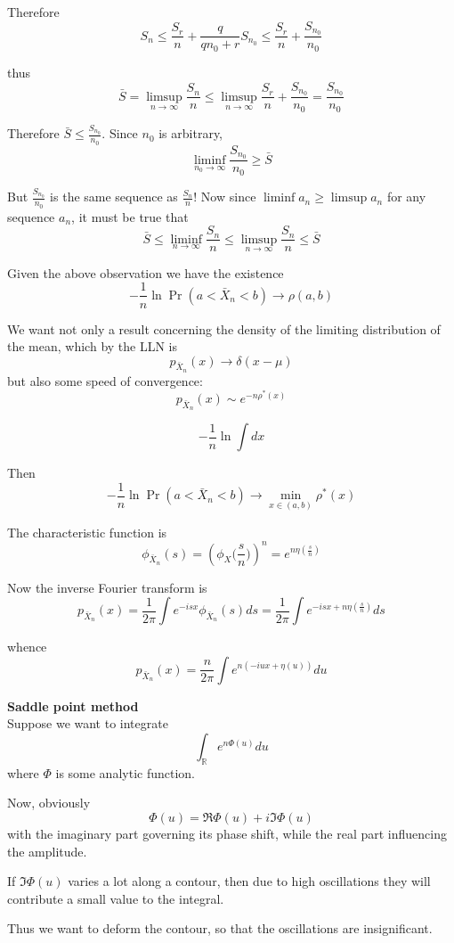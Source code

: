 \documentclass[a4paper]{article}
\newcommand{\brac}[1]{{\left ( #1 \right )}}
\newcommand{\Real}{\mathbb{R}}
\begin{document}
Therefore 
\[S_n \leq \frac{S_r}{n} + \frac{q}{q n_0 + r}S_{n_0}\leq \frac{S_r}{n} + \frac{S_{n_0}}{n_0}\]

thus
\[\bar{S} = \limsup_{n\to \infty} \frac{S_n}{n} \leq \limsup_{n\to \infty} \frac{S_r}{n} + \frac{S_{n_0}}{n_0} = \frac{S_{n_0}}{n_0}\]

Therefore $\bar{S}\leq \frac{S_{n_0}}{n_0}$. Since $n_0$ is arbitrary, 
\[\liminf_{n_0\to\infty} \frac{S_{n_0}}{n_0} \geq \bar{S}\]

But $\frac{S_{n_0}}{n_0}$ is the same sequence as $\frac{S_n}{n}$! Now since $\liminf a_n \geq \limsup a_n$ for any sequence $a_n$, it must be true that
\[\bar{S}\leq \liminf_{n\to\infty} \frac{S_n}{n} \leq \limsup_{n\to\infty} \frac{S_n}{n} \leq \bar{S}\]

Given the above observation we have the existence
\[-\frac{1}{n}\ln \Pr\brac{a<\bar{X}_n<b} \to \rho(a,b)\]

We want not only a result concerning the density of the limiting distribution of the mean, which by the LLN is \[p_{\bar{X}_n}(x)\to \delta(x-\mu)\]
but also some speed of convergence:
\[p_{\bar{X}_n}(x)\sim e^{-n \rho^*(x)}\]

\[ -\frac{1}{n} \ln \int dx \]

Then 
\[-\frac{1}{n}\ln \Pr\brac{a<\bar{X}_n<b} \to \min_{x\in (a,b)} \rho^*(x)\]

The characteristic function is
\[\phi_{\bar{X}_n}(s) = \brac{\phi_X\big(\frac{s}{n}\big)}^n = e^{n\eta(\frac{s}{n})}\]

Now the inverse Fourier transform is 
\[p_{\bar{X}_n}(x) = \frac{1}{2\pi}\int e^{-isx } \phi_{\bar{X}_n}(s) ds = \frac{1}{2\pi}\int e^{-isx + n \eta(\frac{s}{n})} ds\]

whence
\[p_{\bar{X}_n}(x) = \frac{n}{2\pi}\int e^{n\brac{-iux + \eta(u)}} du\]

\noindent \textbf{Saddle point method} \hfill\\
Suppose we want to integrate 
\[\int_\Real e^{n\Phi(u)} du\]
where $\Phi$ is some analytic function.

Now, obviously 
\[\Phi(u) = \Re \Phi(u) + i \Im\Phi(u)\]
with the imaginary part governing its phase shift, while the real part influencing the amplitude.

If $\Im\Phi(u)$ varies a lot along a contour, then due to high oscillations they will contribute a small value to the integral.

Thus we want to deform the contour, so that the oscillations are insignificant.
\end{document}
